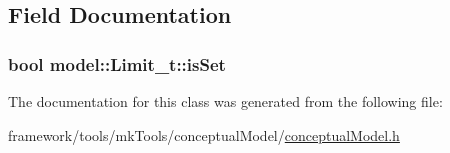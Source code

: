 \subsection{Field Documentation}
\subsubsection[{\texorpdfstring{is\+Set}{isSet}}]{\setlength{\rightskip}{0pt plus 5cm}bool model\+::\+Limit\+\_\+t\+::is\+Set\hspace{0.3cm}{\ttfamily [protected]}}\hypertarget{classmodel_1_1_limit__t_a8a01c4154cd8093d72f1acdd7207036d}{}\label{classmodel_1_1_limit__t_a8a01c4154cd8093d72f1acdd7207036d}


The documentation for this class was generated from the following file\+:\begin{DoxyCompactItemize}
\item 
framework/tools/mk\+Tools/conceptual\+Model/\hyperlink{conceptual_model_8h}{conceptual\+Model.\+h}\end{DoxyCompactItemize}

